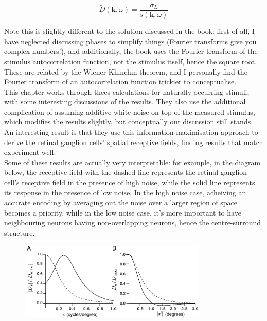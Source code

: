 \documentclass{article}
\begin{document}
\begin{equation*}
    \tilde{D}(\bm{k},\omega)=\frac{\sigma_L}{\tilde{s}(\bm{k},\omega)}
\end{equation*}

Note this is slightly different to the solution discussed in the book: first of all, I have neglected discussing phases to simplify things (Fourier transforms give you complex numbers!), and additionally, the book uses the Fourier transform of the stimulus autocorrelation function, not the stimulus itself, hence the square root. These are related by the Wiener-Khinchin theorem, and I personally find the Fourier transform of an autocorrelation function trickier to conceptualise.\\

This chapter works through thees calculations for naturally occurring stimuli, with some interesting discussions of the results. They also use the additional complication of assuming additive white noise on top of the measured stimulus, which modifies the results slightly, but conceptually our discussion still stands. An interesting result is that they use this information-maximisation approach to derive the retinal ganglion cells' spatial receptive fields, finding results that match experiment well.\\

Some of these results are actually very interpretable: for example, in the diagram below, the receptive field with the dashed line represents the retinal ganglion cell's receptive field in the presence of high noise, while the solid line represents its response in the presence of low noise. In the high noise case, acheiving an accurate encoding by averaging out the noise over a larger region of space becomes a priority, while in the low noise case, it's more important to have neighbouring neurons having non-overlapping neurons, hence the centre-surround structure.

\begin{figure}[H]
    \centering
    \includegraphics[width=0.8\textwidth]{receptive.png}
\end{figure}
\end{document}
